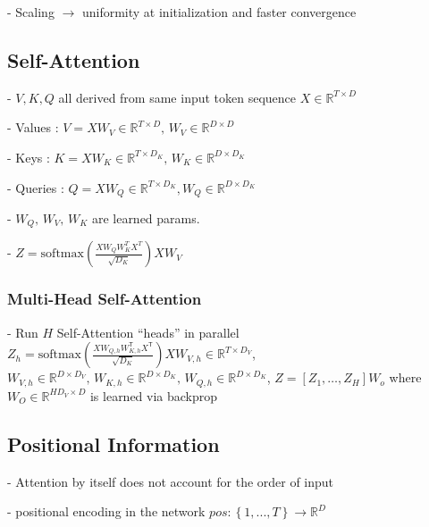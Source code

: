 
- Scaling $\rightarrow$ uniformity at initialization and faster convergence

\subsection*{Self-Attention}



- $V,K,Q$ all derived from same input token
sequence $X\in\mathbb{R}^{T\times D}$

- Values : $V=X W_{V}\in\mathbb{R}^{T\times D},\,W_{V}\in\mathbb{R}^{D\times D}$

- Keys : $K=X W_{K}\in\mathbb{R}^{T\times D_{K}},\,W_{K}\in\mathbb{R}^{D\times D_{K}}$

- Queries : $Q=X W_{Q}\in\mathbb{R}^{T\times D_{K}},W_{Q}\in\mathbb{R}^{D\times D_{K}}$

- $W_{Q},\,W_{V},\,W_{K}$ are learned params.

- $Z=\mathrm{softmax}\left(\frac{X W_{Q}W_{K}^{T}X^{T}}{\sqrt{D_{K}}}\right)X W_{V}$

\subsubsection*{Multi-Head Self-Attention}


- Run $H$ Self-Attention “heads” in parallel 
$Z_{h}={\mathrm{softmax}}\left({\frac{X W_{Q,h}W_{K,h}^{\mathsf{T}}X^{\mathsf{T}}}{\sqrt{D_{K}}}}\right)X W_{V,h}\in\mathbb{R}^{T\times D_{V}}$, 
$W_{V,h}\in\mathbb{R}^{D\times D_{V}},\,W_{K,h}\in\mathbb{R}^{D\times D_{K}},\,W_{Q,h}\in\mathbb{R}^{D\times D_{K}}$,
$Z=[Z_{1},\dots,Z_{H}]W_{o}$ where $W_{O}\in\mathbb{R}^{H D_{V}\times D}$ is learned via backprop

\subsection*{Positional Information}

- Attention by itself does not account for the order of input

- positional encoding in the network $p o s:\left\{1,...,T\right\}\rightarrow\mathbb{R}^{D}$

